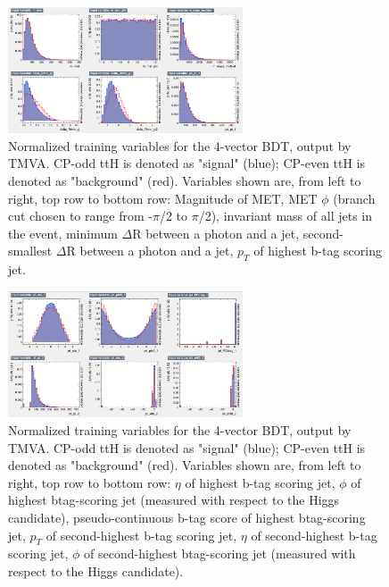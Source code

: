 \begin{figure}[htbp]
  \centering
  \includegraphics[width=0.62\textwidth]{figures/TMVABDTStudies/lep-vbls4vec/lep4vecvbls2.png}
  \caption{Normalized training variables for the 4-vector BDT, output by TMVA. CP-odd ttH is denoted as "signal" (blue); CP-even ttH is denoted as "background" (red). Variables shown are, from left to right, top row to bottom row: Magnitude of MET, MET $\phi$ (branch cut chosen to range from -$\pi$/2 to $\pi$/2), invariant mass of all jets in the event, minimum $\Delta$R between a photon and a jet, second-smallest $\Delta$R between a photon and a jet, $p_{T}$ of highest b-tag scoring jet.}
  \label{fig:lep4vecvbls2}
\end{figure}

\begin{figure}[htbp]
  \centering
  \includegraphics[width=0.62\textwidth]{figures/TMVABDTStudies/lep-vbls4vec/lep4vecvbls3.png}
  \caption{Normalized training variables for the 4-vector BDT, output by TMVA. CP-odd ttH is denoted as "signal" (blue); CP-even ttH is denoted as "background" (red). Variables shown are, from left to right, top row to bottom row: $\eta$ of highest b-tag scoring jet, $\phi$ of highest btag-scoring jet (measured with respect to the Higgs candidate), pseudo-continuous b-tag score of highest btag-scoring jet, $p_{T}$ of second-highest b-tag scoring jet, $\eta$ of second-highest b-tag scoring jet, $\phi$ of second-highest btag-scoring jet (measured with respect to the Higgs candidate).}
  \label{fig:lep4vecvbls3}
\end{figure}

